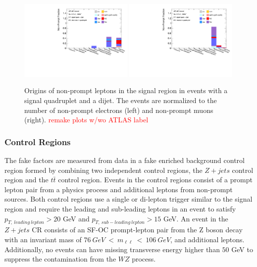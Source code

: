 \begin{figure}[htb]
    \centering
    \includegraphics[width = 0.49\textwidth]{figures/Analysis/Background/NonPromptElectronSRVBSComposition.pdf}
    \includegraphics[width = 0.49\textwidth]{figures/Analysis/Background/NonPromptMuonSRVBSComposition.pdf}
    \caption{ Origins of non-prompt leptons in the signal region in events with a signal quadruplet and a dijet. The events are normalized to the number of non-prompt electrons (left) and non-prompt muons (right). \textcolor{red}{remake plots w/wo ATLAS label} \label{fig:NonPromptLepSRDijet}}
\end{figure}

\subsubsection{Control Regions}
\label{subsubsec:CR}
The fake factors are measured from data in a fake enriched background control region formed by combining two independent control regions, the $Z+jets$ control region and the $t\bar{t}$ control region. Events in the control regions consist of a prompt lepton pair from a physics process and additional leptons from non-prompt sources. Both control regions use a single or di-lepton trigger similar to the signal region and require the leading and sub-leading leptons in an event to satisfy $p_{T,~leading~lepton} > 20$ GeV and $p_{T,~sub-leading~lepton} > 15$ GeV. An event in the $Z+jets$ CR consists of an SF-OC prompt-lepton pair from the Z boson decay with an invariant mass of $ 76~GeV~<~m_{\ell \ell}~<~106~GeV$, and additional leptons. Additionally, no events can have missing transverse energy higher than $50$ GeV to suppress the contamination from the $WZ$ process.

